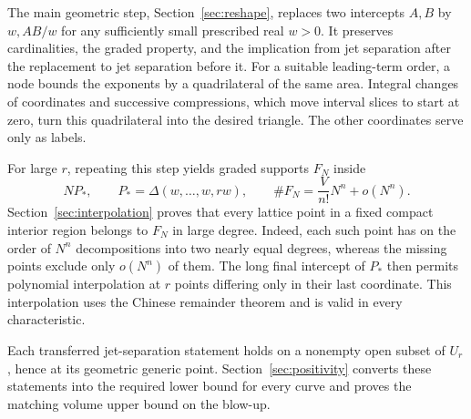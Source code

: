 The main geometric step, Section~\ref{sec:reshape}, replaces two
intercepts $A,B$ by $w,AB/w$ for any sufficiently small prescribed real
$w>0$. It preserves cardinalities, the graded property, and the
implication from jet separation after the replacement to jet separation
before it. For a suitable leading-term order, a node bounds the exponents
by a quadrilateral of the same area. Integral changes of coordinates and successive compressions,
which move interval slices to start at zero, turn this quadrilateral
into the desired triangle. The other coordinates serve only as labels.

For large $r$, repeating this step yields graded supports $F_N$ inside
\[
 NP_*,\qquad P_* =\Delta(w,\ldots,w,rw),
 \qquad \#F_N=\frac{V}{n!}N^n+o(N^n).
\]
Section~\ref{sec:interpolation} proves that every lattice point in a
fixed compact interior region belongs to $F_N$ in large degree. Indeed,
each such point has on the order of $N^n$ decompositions into two
nearly equal degrees, whereas the missing points exclude only $o(N^n)$
of them. The long final intercept of $P_*$ then permits polynomial
interpolation at $r$ points differing only in their last coordinate.
This interpolation uses the Chinese remainder theorem and is valid in
every characteristic.

Each transferred jet-separation statement holds on a nonempty open
subset of $U_r$, hence at its geometric generic point.
Section~\ref{sec:positivity} converts these statements into the required
lower bound for every curve and proves the matching volume upper bound
on the blow-up.
